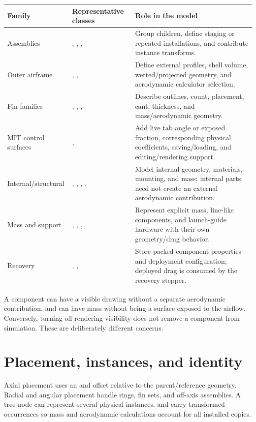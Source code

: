 \begin{longtable}{@{}L{3cm}L{5.1cm}L{7cm}@{}}
\toprule Family & Representative classes & Role in the model\\\midrule\endhead
Assemblies & , , ,  & Group children, define staging or repeated installations, and contribute instance transforms.\\
Outer airframe & , ,  & Define external profiles, shell volume, wetted/projected geometry, and aerodynamic calculator selection.\\
Fin families & , , ,  & Describe outlines, count, placement, cant, thickness, and mass/aerodynamic geometry.\\
MIT control surfaces & ,  & Add live tab angle or exposed fraction, corresponding physical coefficients, saving/loading, and editing/rendering support.\\
Internal/structural & , , , ,  & Model internal geometry, materials, mounting, and mass; internal parts need not create an external aerodynamic contribution.\\
Mass and support & , , ,  & Represent explicit mass, line-like components, and launch-guide hardware with their own geometry/drag behavior.\\
Recovery & , ,  & Store packed-component properties and deployment configuration; deployed drag is consumed by the recovery stepper.\\\bottomrule
\end{longtable}

A component can have a visible drawing without a separate aerodynamic contribution, and can have mass without being a surface exposed to the airflow. Conversely, turning off rendering visibility does not remove a component from simulation. These are deliberately different concerns.

\section{Placement, instances, and identity}
Axial placement uses an  and offset relative to the parent/reference geometry. Radial and angular placement handle rings, fin sets, and off-axis assemblies. A tree node can represent several physical instances.  and  carry transformed occurrences so mass and aerodynamic calculations account for all installed copies.

